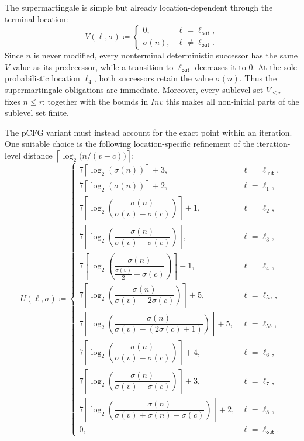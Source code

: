 The supermartingale is simple but already location-dependent through the
terminal location:
\[
    V(\ell,\sigma)
    \coloneqq
    \begin{cases}
        0, & \ell=\ell_{\mathsf{out}},\\
        \sigma(n), & \ell\neq\ell_{\mathsf{out}}.
    \end{cases}
\]
Since $n$ is never modified, every nonterminal deterministic successor has
the same $V$-value as its predecessor, while a transition to
$\ell_{\mathsf{out}}$ decreases it to $0$.  At the sole probabilistic location
$\ell_4$, both successors retain the value $\sigma(n)$.  Thus the
supermartingale obligations are immediate.  Moreover, every sublevel set
$V_{\leq r}$ fixes $n\leq r$; together with the bounds in
$\mathit{Inv}$ this makes all non-initial parts of the sublevel set finite.

The pCFG variant must instead account for the exact point within an iteration.
One suitable choice is the following location-specific refinement of the
iteration-level distance
$\left\lceil\log_2\!\bigl(n/(v-c)\bigr)\right\rceil$:
\[
U(\ell,\sigma)\coloneqq
\begin{cases}
  7\left\lceil\log_2(\sigma(n))\right\rceil+3,
    & \ell=\ell_{\mathsf{init}},\\[2pt]
  7\left\lceil\log_2(\sigma(n))\right\rceil+2,
    & \ell=\ell_1,\\[2pt]
  7\left\lceil
      \log_2\!\left(\dfrac{\sigma(n)}{\sigma(v)-\sigma(c)}\right)
    \right\rceil+1,
    & \ell=\ell_2,\\[8pt]
  7\left\lceil
      \log_2\!\left(\dfrac{\sigma(n)}{\sigma(v)-\sigma(c)}\right)
    \right\rceil,
    & \ell=\ell_3,\\[8pt]
  7\left\lceil
      \log_2\!\left(
        \dfrac{\sigma(n)}{\frac{\sigma(v)}2-\sigma(c)}
      \right)
    \right\rceil-1,
    & \ell=\ell_4,\\[10pt]
  7\left\lceil
      \log_2\!\left(
        \dfrac{\sigma(n)}{\sigma(v)-2\sigma(c)}
      \right)
    \right\rceil+5,
    & \ell=\ell_{5a},\\[10pt]
  7\left\lceil
      \log_2\!\left(
        \dfrac{\sigma(n)}{\sigma(v)-(2\sigma(c)+1)}
      \right)
    \right\rceil+5,
    & \ell=\ell_{5b},\\[10pt]
  7\left\lceil
      \log_2\!\left(\dfrac{\sigma(n)}{\sigma(v)-\sigma(c)}\right)
    \right\rceil+4,
    & \ell=\ell_6,\\[10pt]
  7\left\lceil
      \log_2\!\left(\dfrac{\sigma(n)}{\sigma(v)-\sigma(c)}\right)
    \right\rceil+3,
    & \ell=\ell_7,\\[10pt]
  7\left\lceil
      \log_2\!\left(
        \dfrac{\sigma(n)}{\sigma(v)+\sigma(n)-\sigma(c)}
      \right)
    \right\rceil+2,
    & \ell=\ell_8,\\[10pt]
  0,
    & \ell=\ell_{\mathsf{out}}.
\end{cases}
\]

